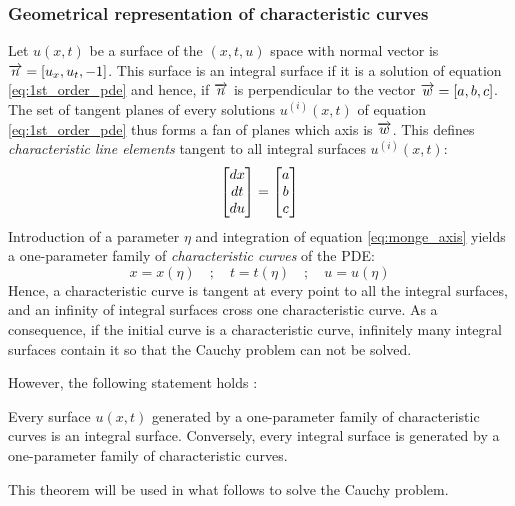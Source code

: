 \subsubsection*{Geometrical representation of characteristic curves}
Let $u(x,t)$ be a surface of the $(x,t,u)$ space with normal vector is ${\overrightarrow{n}}=[u_x,u_t,-1]$. This surface is an integral surface if it is a solution of equation \eqref{eq:1st_order_pde} and hence, if ${\overrightarrow{n}}$ is perpendicular to the vector ${\overrightarrow{w}}=[a,b,c]$.
The set of tangent planes of every solutions $u^{(i)}(x,t)$ of equation \eqref{eq:1st_order_pde} thus forms a fan of planes which axis is ${\overrightarrow{w}}$.
This defines \textit{characteristic line elements} tangent to all integral surfaces $u^{(i)}(x,t)$:
\begin{equation}
  \label{eq:monge_axis}
  \left[\begin{matrix}dx \\ dt \\ du\end{matrix}\right] = \left[\begin{matrix}a \\ b \\c\end{matrix}\right]
\end{equation}
Introduction of a parameter $\eta$ and integration of equation \eqref{eq:monge_axis} yields a one-parameter family of \textit{characteristic curves} of the PDE:
\begin{equation*}
  x=x(\eta) \quad ; \quad t=t(\eta) \quad ; \quad u=u(\eta)
\end{equation*}
Hence, a characteristic curve is tangent at every point to all the integral surfaces, and an infinity of integral surfaces cross one characteristic curve. As a consequence, if the initial curve is a characteristic curve, infinitely many integral surfaces contain it so that the Cauchy problem can not be solved.

However, the following statement holds \cite[Ch.1]{Courant}:
\begin{theorem}[Courant]
  \label{th:integral_surface_generated}
  Every surface $u(x,t)$ generated by a one-parameter family of characteristic curves is an integral surface. Conversely, every integral surface is generated by a one-parameter family of characteristic curves.
\end{theorem}
This theorem will be used in what follows to solve the Cauchy problem.

